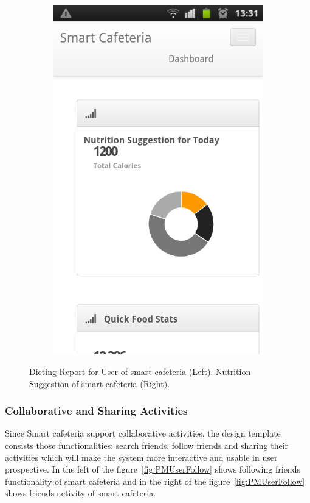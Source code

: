 \begin{figure}[h]
{\begin{subfigure}[b]{.5\textwidth}
{  \includegraphics[width=0.9\linewidth]{ch4/Prototype/Mobile/suggestion}
  }
\end{subfigure}
}
\caption{Dieting Report for User of smart cafeteria (Left). Nutrition Suggestion of smart cafeteria (Right).}
\label{fig:PMReport}
\end{figure}
\newpage

\subsubsection{Collaborative and Sharing Activities}
\label{Searchfollowingfriends}
Since Smart cafeteria support collaborative activities, the design template
consists those functionalities: search friends, follow friends and sharing their
activities which will make the system more interactive and usable in user
prospective. In the left of the figure~\ref{fig:PMUserFollow} shows following
friends functionality of smart cafeteria and in the right of the
figure~\ref{fig:PMUserFollow} shows friends activity of smart cafeteria.

